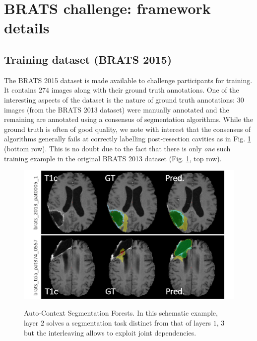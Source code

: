 
\section{BRATS challenge: framework details}

\subsection{Training dataset (BRATS 2015)}

The BRATS 2015 dataset is made available to challenge participants for training. It contains $274$ images along with their ground truth annotations. One of the interesting aspects of the dataset is the nature of ground truth annotations: $30$ images (from the BRATS 2013 dataset) were manually annotated and the remaining are annotated using a consensus of segmentation algorithms. While the ground truth is often of good quality, we note with interest that the consensus of algorithms generally fails at correctly labelling post-resection cavities as in Fig. \ref{fig: post-resection cavities} (bottom row). This is no doubt due to the fact that there is only \textit{one} such training example in the original BRATS 2013 dataset (Fig. \ref{fig: post-resection cavities}, top row). 

\begin{figure}
\centering
\includegraphics[width=1\textwidth]{images/BRATS2015_post-resection-cavities.png}
\label{fig: post-resection cavities}
\caption{Auto-Context Segmentation Forests. In this schematic example, layer $2$ solves a segmentation task distinct from that of layers $1$, $3$ but the interleaving allows to exploit joint dependencies.}
\end{figure}

